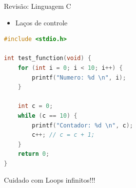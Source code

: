 \begin{frame}[fragile]{Revisão: Linguagem C}
    \begin{itemize}
        \item Laços de controle
    \end{itemize}

\begin{lstlisting}[language=C,basicstyle=\ttfamily\scriptsize]
#include <stdio.h>

int test_function(void) {
    for (int i = 0; i < 10; i++) {
        printf("Numero: %d \n", i);
    }
    
    int c = 0;
    while (c == 10) {
        printf("Contador: %d \n", c);
        c++; // c = c + 1;
    }
    return 0;
}
\end{lstlisting}

Cuidado com Loops infinitos!!!
\end{frame}